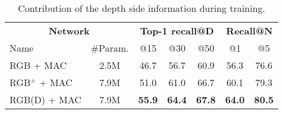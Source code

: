 {
\setlength{\tabcolsep}{5pt}
\renewcommand{\arraystretch}{1.2}
\begin{table}
	\centering
	
	\begin{minipage}{0.65\linewidth}
		\scriptsize
		\begin{tabular}{ l  c | c  c  c | c  c}
			\multicolumn{2}{c|}{\textbf{Network}} & \multicolumn{3}{c|}{\textbf{Top-1 recall@D}} & \multicolumn{2}{c}{\textbf{Recall@N}} \\	
			Name & \#Param.  	& @15 & @30 & @50 & @1 & @5\\
			\hline
			RGB + MAC &  2.5M		& 46.7 & 56.7 & 60.9 & 56.3 & 76.6 \\
			RGB$^{+}$ + MAC & 7.9M	& 51.0 & 61.0 & 66.7 & 60.1 &  79.3 \\  
			RGB(D) + MAC &  7.9M	& \textbf{55.9} & \textbf{64.4} & \textbf{67.8} & \textbf{64.0} &  \textbf{80.5} \\
			\hline
		\end{tabular}
	\end{minipage}\hfill
	\begin{minipage}{0.35\linewidth}
		\caption{\label{tab/eval_depth} Contribution of the depth side information during training.}
	\end{minipage}
	
\end{table}
}